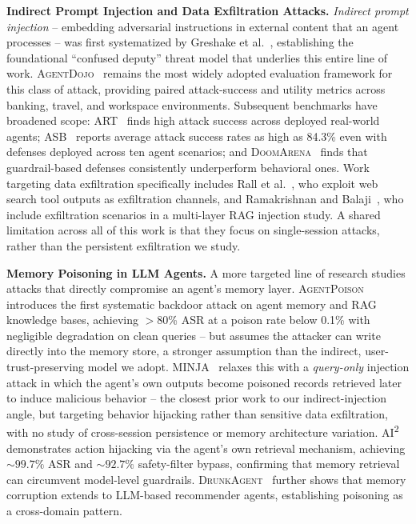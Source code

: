\documentclass[sigconf]{acmart}
\begin{document}
\textbf{Indirect Prompt Injection and Data Exfiltration Attacks.}
\emph{Indirect prompt injection} -- embedding adversarial instructions in external content
that an agent processes -- was first systematized by Greshake et
al.~\citep{greshake2023not}, establishing the foundational ``confused deputy'' threat
model that underlies this entire line of work.
\textsc{AgentDojo}~\citep{debenedetti2024agentdojo} remains the most widely adopted
evaluation framework for this class of attack, providing paired attack-success and utility
metrics across banking, travel, and workspace environments.
Subsequent benchmarks have broadened scope: \textsc{ART}~\citep{zou2025security} finds high
attack success across deployed real-world agents; \textsc{ASB}~\citep{zhang2024asb} reports
average attack success rates as high as 84.3\% even with defenses deployed across ten agent
scenarios; and \textsc{DoomArena}~\citep{boisvert2025doomarena} finds that guardrail-based
defenses consistently underperform behavioral ones.
Work targeting data exfiltration specifically includes Rall et al.~\citep{rall2025websearch},
who exploit web search tool outputs as exfiltration channels, and Ramakrishnan and
Balaji~\citep{ramakrishnan2025securing}, who include exfiltration scenarios in a multi-layer
RAG injection study.
A shared limitation across all of this work is that they focus on single-session attacks, rather than the persistent exfiltration we study.

\textbf{Memory Poisoning in LLM Agents.}
A more targeted line of research studies attacks that directly compromise an agent's memory
layer.
\textsc{AgentPoison}~\citep{chen2024agentpoison} introduces the first systematic backdoor
attack on agent memory and RAG knowledge bases, achieving $>$80\% ASR at a poison rate
below 0.1\% with negligible degradation on clean queries -- but assumes the attacker can
write directly into the memory store, a stronger assumption than the indirect,
user-trust-preserving model we adopt.
\textsc{MINJA}~\citep{dong2025memory} relaxes this with a \emph{query-only} injection
attack in which the agent's own outputs become poisoned records retrieved later to induce
malicious behavior -- the closest prior work to our indirect-injection angle, but targeting
behavior hijacking rather than sensitive data exfiltration, with no study of cross-session
persistence or memory architecture variation.
\textsc{AI\textsuperscript{2}}~\citep{zhang2024ai2} demonstrates action hijacking via the
agent's own retrieval mechanism, achieving ${\sim}99.7\%$ ASR and ${\sim}92.7\%$
safety-filter bypass, confirming that memory retrieval can circumvent model-level
guardrails. \textsc{DrunkAgent}~\citep{yang2025drunkagent} further shows that memory
corruption extends to LLM-based recommender agents, establishing poisoning as a
cross-domain pattern.
\end{document}
